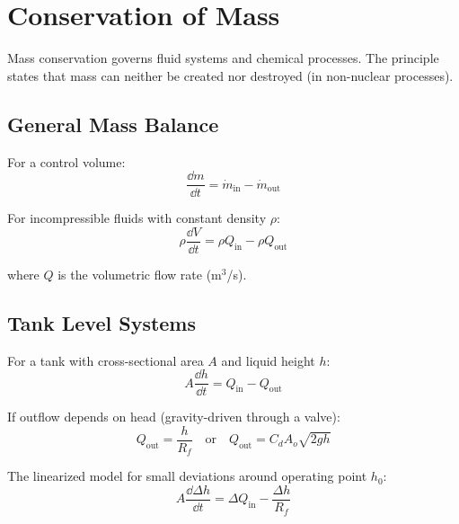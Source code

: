 \section{Conservation of Mass}
\label{sec:mass_conservation}

Mass conservation governs fluid systems and chemical processes. The principle states that mass can neither be created nor destroyed (in non-nuclear processes).

\subsection{General Mass Balance}

For a control volume:
\begin{equation}
\frac{\dd m}{\dd t} = \dot{m}_{\text{in}} - \dot{m}_{\text{out}}
\label{eq:mass_balance}
\end{equation}

For incompressible fluids with constant density $\rho$:
\begin{equation}
\rho\frac{\dd V}{\dd t} = \rho Q_{\text{in}} - \rho Q_{\text{out}}
\label{eq:volume_balance}
\end{equation}

where $Q$ is the volumetric flow rate (m$^3$/s).

\subsection{Tank Level Systems}

For a tank with cross-sectional area $A$ and liquid height $h$:
\begin{equation}
A\frac{\dd h}{\dd t} = Q_{\text{in}} - Q_{\text{out}}
\label{eq:tank_level}
\end{equation}

If outflow depends on head (gravity-driven through a valve):
\begin{equation}
Q_{\text{out}} = \frac{h}{R_f} \quad \text{or} \quad Q_{\text{out}} = C_d A_o \sqrt{2gh}
\label{eq:tank_outflow}
\end{equation}

The linearized model for small deviations around operating point $h_0$:
\begin{equation}
A\frac{\dd \Delta h}{\dd t} = \Delta Q_{\text{in}} - \frac{\Delta h}{R_f}
\label{eq:tank_linearized}
\end{equation}

